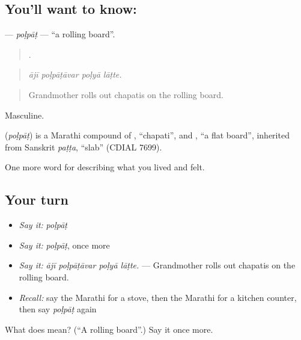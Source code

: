 \subsection*{You'll want to know: }
\textbf{} — \emph{poḷpāṭ} — \textquotedblleft{}a rolling board\textquotedblright{}.

\begin{quote}
   .
\end{quote}

\begin{quote}
\emph{ājī poḷpāṭāvar poḷyā lāṭte.}
\end{quote}

\begin{quote}
Grandmother rolls out chapatis on the rolling board.
\end{quote}

Masculine.

\begin{cousinweb}
\textbf{} (\emph{poḷpāṭ}) is a Marathi compound of , \textquotedblleft{}chapati\textquotedblright{}, and , \textquotedblleft{}a flat board\textquotedblright{}, inherited from Sanskrit \emph{paṭṭa}, \textquotedblleft{}slab\textquotedblright{} (CDIAL 7699).
\end{cousinweb}

\begin{grammarlens}[title={What you've built}]
One more word for describing what you lived and felt.
\end{grammarlens}

\subsection*{Your turn}
\begin{itemize}
\raggedright
  \item \emph{Say it:} \emph{poḷpāṭ}
  \item \emph{Say it:} \emph{poḷpāṭ}, once more
  \item \emph{Say it:} \emph{ājī poḷpāṭāvar poḷyā lāṭte.} — Grandmother rolls out chapatis on the rolling board.
  \item \emph{Recall:} say the Marathi for a stove, then the Marathi for a kitchen counter, then say \emph{poḷpāṭ} again
\end{itemize}

\begin{tcolorbox}[breakable,colback=teal!4,colframe=teal!35!black,title={Before you move on}]
What does  mean? (\textquotedblleft{}A rolling board\textquotedblright{}.) Say it once more.
\end{tcolorbox}
